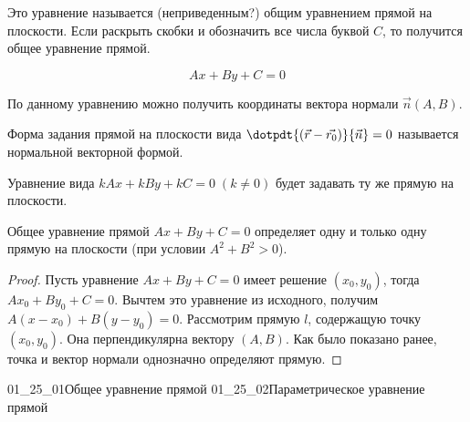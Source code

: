 Это уравнение называется (неприведенным?) общим уравнением прямой на плоскости.
Если раскрыть скобки и обозначить все числа буквой \(C\), то получится общее
уравнение прямой.

\begin{equation*}
  A x + B y + C = 0
\end{equation*}

\begin{remark}
  По данному уравнению можно получить координаты вектора нормали
  \(\vec{n}(A, B)\).
\end{remark}

\begin{remark}
  Форма задания прямой на плоскости вида \(\dotpdt{(\vec{r} -
  \vec{r_0})}{\vec{n}} = 0\) называется нормальной векторной формой.  
\end{remark}

\begin{remark}
  Уравнение вида \(k A x + k B y + k C = 0 \; (k \ne 0)\) будет задавать ту же
  прямую на плоскости.
\end{remark}

\begin{theorem}
  Общее уравнение прямой \(A x + B y + C = 0\) определяет одну и только одну
  прямую на плоскости (при условии \(A^2 + B^2 > 0\)).
\end{theorem}

\begin{proof}
  Пусть уравнение \(A x + B y + C = 0\) имеет решение \((x_0, y_0)\), тогда
  \(A x_0 + B y_0 + C = 0\). Вычтем это уравнение из исходного, получим
  \(A (x - x_0) + B (y - y_0) = 0\). Рассмотрим прямую \(l\), содержащую точку
  \((x_0, y_0)\). Она перпендикулярна вектору \((A, B)\). Как было показано
  ранее, точка и вектор нормали однозначно определяют прямую.
\end{proof}

\gallerydouble
  {01_25_01}{Общее уравнение прямой}
  {01_25_02}{Параметрическое уравнение прямой}



